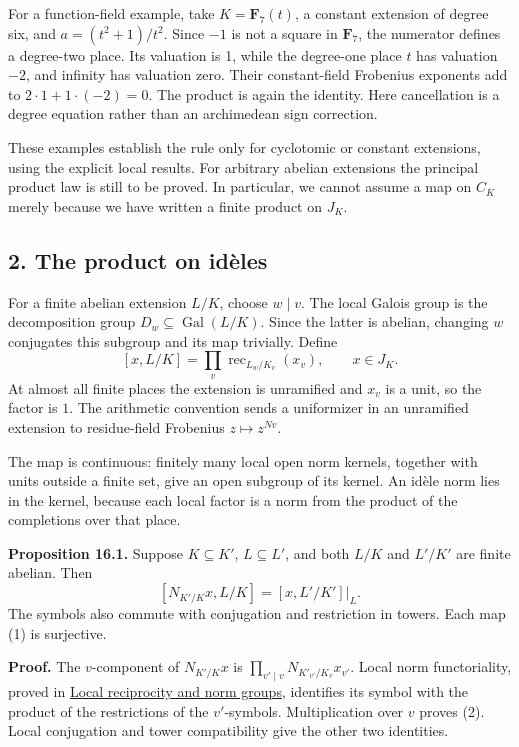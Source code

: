 \documentclass[11pt,a4paper]{article}
\begin{document}
For a function-field example, take \(K=\mathbf F_7(t)\), a constant
extension of degree six, and \(a=(t^2+1)/t^2\). Since \(-1\) is not a
square in \(\mathbf F_7\), the numerator defines a degree-two place. Its
valuation is 1, while the degree-one place \(t\) has valuation \(-2\),
and infinity has valuation zero. Their constant-field Frobenius
exponents add to \(2\cdot1+1\cdot(-2)=0\). The product is again the
identity. Here cancellation is a degree equation rather than an
archimedean sign correction.

These examples establish the rule only for cyclotomic or constant
extensions, using the explicit local results. For arbitrary abelian
extensions the principal product law is still to be proved. In
particular, we cannot assume a map on \(C_K\) merely because we have
written a finite product on \(J_K\).

\subsection{2. The product on idèles}\label{the-product-on-iduxe8les}

For a finite abelian extension \(L/K\), choose \(w\mid v\). The local
Galois group is the decomposition group
\(D_w\subseteq\operatorname{Gal}(L/K)\). Since the latter is abelian,
changing \(w\) conjugates this subgroup and its map trivially. Define \[
[x,L/K]=\prod_v\operatorname{rec}_{L_w/K_v}(x_v),
\qquad x\in J_K.
\tag{1}
\] At almost all finite places the extension is unramified and \(x_v\)
is a unit, so the factor is \(1\). The arithmetic convention sends a
uniformizer in an unramified extension to residue-field Frobenius
\(z\mapsto z^{Nv}\).

The map is continuous: finitely many local open norm kernels, together
with units outside a finite set, give an open subgroup of its kernel. An
idèle norm lies in the kernel, because each local factor is a norm from
the product of the completions over that place.

\textbf{Proposition 16.1.} Suppose \(K\subseteq K'\), \(L\subseteq L'\),
and both \(L/K\) and \(L'/K'\) are finite abelian. Then \[
[N_{K'/K}x,L/K]
=[x,L'/K']|_L.
\tag{2}
\] The symbols also commute with conjugation and restriction in towers.
Each map (1) is surjective.

\textbf{Proof.} The \(v\)-component of \(N_{K'/K}x\) is
\(\prod_{v'\mid v}N_{K'_{v'}/K_v}x_{v'}\). Local norm functoriality,
proved in \href{../local-reciprocity-and-norm-groups.html}{Local
reciprocity and norm groups}, identifies its symbol with the product of
the restrictions of the \(v'\)-symbols. Multiplication over \(v\) proves
(2). Local conjugation and tower compatibility give the other two
identities.
\end{document}

